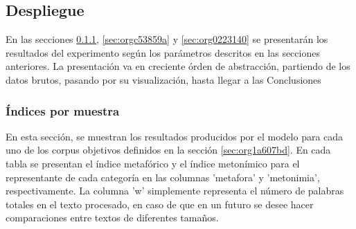 \documentclass[12pt,letterpaper,twoside]{article}
\begin{document}
\subsection{Despliegue}
\label{sec:orga19d87a}
En las secciones \ref{sec:org0358b93}, \ref{sec:orgc53859a} y
\ref{sec:org0223140} se presentarán los resultados del experimento
según los parámetros descritos en las secciones anteriores.
La presentación va en creciente órden de abstracción, partiendo
de los datos brutos, pasando por su visualización, hasta llegar
a las Conclusiones 

\subsubsection{Índices por muestra}
\label{sec:org0358b93}
En esta sección, se muestran los resultados producidos por el modelo
para cada uno de los corpus objetivos definidos en la sección
\ref{sec:org1a607bd}. En cada tabla se presentan el índice
metafórico y el índice metonímico para el representante de cada
categoría en las columnas 'metafora' y 'metonimia',
respectivamente. La columna 'w' simplemente representa el número de
palabras totales en el texto procesado, en caso de que en un futuro se
desee hacer comparaciones entre textos de diferentes tamaños.
\end{document}
